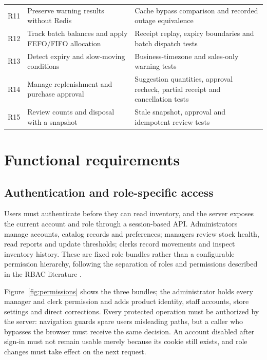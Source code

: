 \begin{longtable}{>{\raggedright\arraybackslash}p{}>{\raggedright\arraybackslash}p{}>{\raggedright\arraybackslash}p{}}
\leavevmode{}R11 & \leavevmode{}Preserve warning results without Redis & \leavevmode{}Cache bypass comparison and recorded outage equivalence \\
\leavevmode{}R12 & \leavevmode{}Track batch balances and apply FEFO/\allowbreak{}FIFO allocation & \leavevmode{}Receipt replay, expiry boundaries and batch dispatch tests \\
\leavevmode{}R13 & \leavevmode{}Detect expiry and slow-moving conditions & \leavevmode{}Business-timezone and sales-only warning tests \\
\leavevmode{}R14 & \leavevmode{}Manage replenishment and purchase approval & \leavevmode{}Suggestion quantities, approval recheck, partial receipt and cancellation tests \\
\leavevmode{}R15 & \leavevmode{}Review counts and disposal with a snapshot & \leavevmode{}Stale snapshot, approval and idempotent review tests \\
\end{longtable}\endgroup

\FloatBarrier

\section{Functional requirements}

\subsection{Authentication and role-specific access}

Users must authenticate before they can read inventory, and the server exposes the current account and role through a session-based API. Administrators manage accounts, catalog records and preferences; managers review stock health, read reports and update thresholds; clerks record movements and inspect inventory history. These are fixed role bundles rather than a configurable permission hierarchy, following the separation of roles and permissions described in the RBAC literature \citep{sandhu1996}.


Figure~\ref{fig:permissions} shows the three bundles; the administrator holds every manager and clerk permission and adds product identity, staff accounts, store settings and direct corrections. Every protected operation must be authorized by the server: navigation guards spare users misleading paths, but a caller who bypasses the browser must receive the same decision. An account disabled after sign-in must not remain usable merely because its cookie still exists, and role changes must take effect on the next request.


